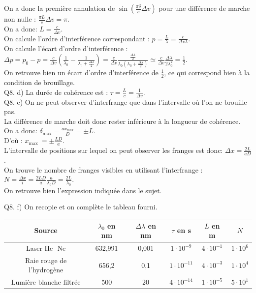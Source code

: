 \documentclass[10pt]{article}
\begin{document}
On a donc la première annulation de \(\sin \left(\frac{\pi \delta}{c} \Delta v\right)\) pour une différence de marche non nulle : \(\frac{\pi L}{c} \Delta v=\pi\).\\
On a donc: \(L=\frac{c}{\Delta v}\).\\
On calcule l'ordre d'interférence correspondant : \(p=\frac{L}{\lambda}=\frac{c}{\Delta v \lambda}\).\\
On calcule l'écart d'ordre d'interférence : \(\Delta p=p_{0}-p=\frac{c}{\Delta v}\left(\frac{1}{\lambda_{0}}-\frac{1}{\lambda_{0}+\frac{\Delta \lambda}{2}}\right)=\frac{c}{\Delta v} \frac{\frac{\Delta \lambda}{2}}{\lambda_{0}\left(\lambda_{0}+\frac{\Delta \lambda}{2}\right)} \simeq \frac{c}{\Delta v} \frac{\Delta \lambda}{2 \lambda_{0}^{2}}=\frac{1}{2}\).\\
On retrouve bien un écart d'ordre d'interférence de \(\frac{1}{2}\), ce qui correspond bien à la condition de brouillage.\\
Q8. d) La durée de cohérence est : \(\tau=\frac{L}{c}=\frac{1}{\Delta v}\).\\
Q8. e) On ne peut observer d'interfrange que dans l'intervalle où l'on ne brouille pas.\\
La différence de marche doit donc rester inférieure à la longueur de cohérence.\\
On a donc: \(\delta_{\max }=\frac{a x_{\max }}{D}= \pm L\).\\
D'où : \(x_{\text {max }}= \pm \frac{L D}{a}\).\\
L'intervalle de positions sur lequel on peut observer les franges est donc: \(\Delta x=\frac{2 L}{a D}\).\\
On trouve le nombre de franges visibles en utilisant l'interfrange : \(N=\frac{\Delta x}{i}=\frac{2 L D}{a} \frac{a}{\lambda_{0} D}=\frac{2 L}{\lambda_{0}}\).\\
On retrouve bien l'expression indiquée dans le sujet.

Q8. f) On recopie et on complète le tableau fourni.

\begin{center}
\begin{tabular}{|c|c|c|c|c|c|}
\hline
Source & \(\lambda_{0}\) en nm & \(\Delta \lambda\) en nm & \(\tau\) en s & \(L\) en m & \(N\) \\
\hline
Laser He -Ne & 632,991 & 0,001 & \(1 \cdot 10^{-9}\) & \(4 \cdot 10^{-1}\) & \(1 \cdot 10^{6}\) \\
\hline
Raie rouge de l'hydrogène & 656,2 & 0,1 & \(1 \cdot 10^{-11}\) & \(4 \cdot 10^{-3}\) & \(1 \cdot 10^{4}\) \\
\hline
Lumière blanche filtrée & 500 & 20 & \(4 \cdot 10^{-14}\) & \(1 \cdot 10^{-5}\) & \(5 \cdot 10^{1}\) \\
\hline
\end{tabular}
\end{center}
\end{document}
